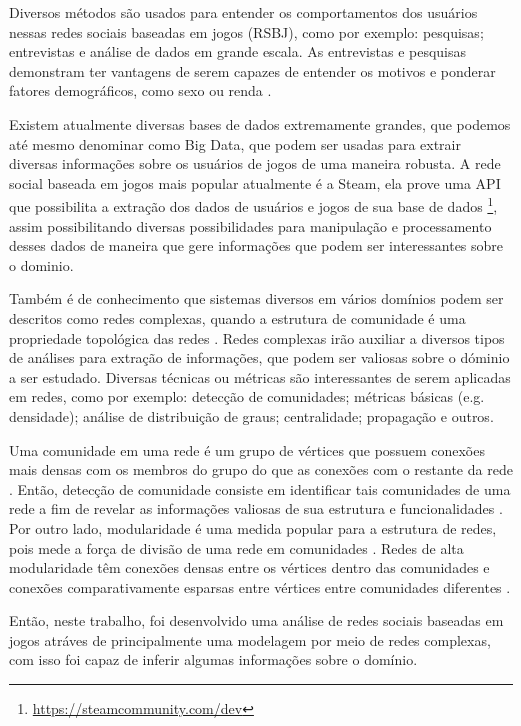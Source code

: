\documentclass[12pt]{article}
\begin{document}
Diversos métodos são usados para entender os comportamentos dos usuários nessas redes sociais baseadas em jogos (RSBJ), como por exemplo: pesquisas; entrevistas e análise de dados em grande escala. As entrevistas e pesquisas demonstram ter vantagens de serem capazes de entender os motivos e ponderar fatores demográficos, como sexo ou renda \cite{yee2006demographics,yee2006motivations}.

Existem atualmente diversas bases de dados extremamente grandes, que podemos até mesmo denominar como Big Data, que podem ser usadas para extrair diversas informações sobre os usuários de jogos de uma maneira robusta. A rede social baseada em jogos mais popular atualmente é a Steam, ela prove uma API que possibilita a extração dos dados de usuários e jogos de sua base de dados \footnote{\url{https://steamcommunity.com/dev}\label{fn:steamapi}}, assim possibilitando diversas possibilidades para manipulação e processamento desses dados de maneira que gere informações que podem ser interessantes sobre o dominio.

Também é de conhecimento que sistemas diversos em vários domínios podem ser descritos como redes complexas, quando a estrutura de comunidade é uma propriedade topológica das redes \cite{albert2002statistical,radicchi2004defining}. Redes complexas irão auxiliar a diversos tipos de análises para extração de informações, que podem ser valiosas sobre o dóminio a ser estudado. Diversas técnicas ou métricas são interessantes de serem aplicadas em redes, como por exemplo: detecção de comunidades; métricas básicas (e.g. densidade); análise de distribuição de graus; centralidade; propagação e outros.

Uma comunidade em uma rede é um grupo de vértices que possuem conexões mais densas com os membros do grupo do que as conexões com o restante da rede \cite{girvan2002community}. Então, detecção de comunidade consiste em identificar tais comunidades de uma rede a fim de revelar as informações valiosas de sua estrutura e funcionalidades \cite{li2020preliminary}. Por outro lado, modularidade é uma medida popular para a estrutura de redes, pois mede a força de divisão de uma rede em comunidades \cite{newman2006modularity,li2020preliminary}. Redes de alta modularidade têm conexões densas entre os vértices dentro das comunidades e conexões comparativamente esparsas entre vértices entre comunidades diferentes \cite{li2020preliminary}.

Então, neste trabalho, foi desenvolvido uma análise de redes sociais baseadas em jogos atráves de principalmente uma modelagem por meio de redes complexas, com isso foi capaz de inferir algumas informações sobre o domínio.
\end{document}
